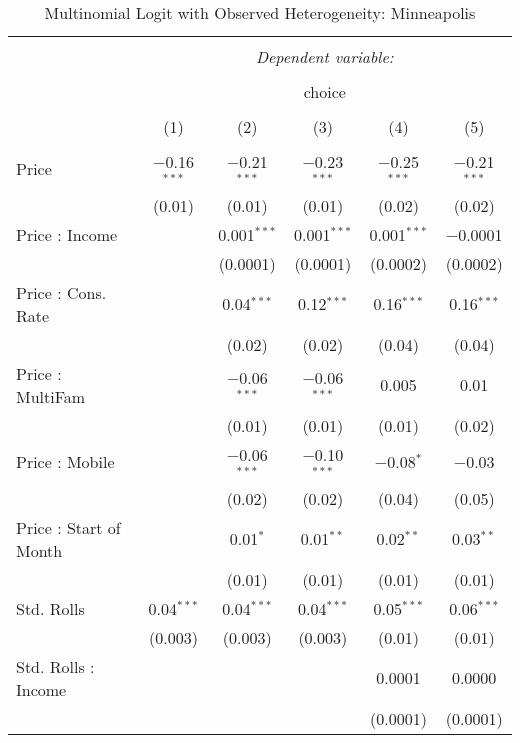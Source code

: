 
\begin{table}[!htbp] \centering 
  \caption{Multinomial Logit with Observed Heterogeneity: Minneapolis} 
  \label{tab:mnlMinneapolisObsHet} 
\begin{tabular}{@{\extracolsep{5pt}}lccccc} 
\\[-1.8ex]\hline 
\hline \\[-1.8ex] 
 & \multicolumn{5}{c}{\textit{Dependent variable:}} \\ 
\cline{2-6} 
\\[-1.8ex] & \multicolumn{5}{c}{choice} \\ 
\\[-1.8ex] & (1) & (2) & (3) & (4) & (5)\\ 
\hline \\[-1.8ex] 
 Price & $-$0.16$^{***}$ & $-$0.21$^{***}$ & $-$0.23$^{***}$ & $-$0.25$^{***}$ & $-$0.21$^{***}$ \\ 
  & (0.01) & (0.01) & (0.01) & (0.02) & (0.02) \\ 
  Price : Income &  & 0.001$^{***}$ & 0.001$^{***}$ & 0.001$^{***}$ & $-$0.0001 \\ 
  &  & (0.0001) & (0.0001) & (0.0002) & (0.0002) \\ 
  Price : Cons. Rate &  & 0.04$^{***}$ & 0.12$^{***}$ & 0.16$^{***}$ & 0.16$^{***}$ \\ 
  &  & (0.02) & (0.02) & (0.04) & (0.04) \\ 
  Price : MultiFam &  & $-$0.06$^{***}$ & $-$0.06$^{***}$ & 0.005 & 0.01 \\ 
  &  & (0.01) & (0.01) & (0.01) & (0.02) \\ 
  Price : Mobile &  & $-$0.06$^{***}$ & $-$0.10$^{***}$ & $-$0.08$^{*}$ & $-$0.03 \\ 
  &  & (0.02) & (0.02) & (0.04) & (0.05) \\ 
  Price : Start of Month &  & 0.01$^{*}$ & 0.01$^{**}$ & 0.02$^{**}$ & 0.03$^{**}$ \\ 
  &  & (0.01) & (0.01) & (0.01) & (0.01) \\ 
  Std. Rolls & 0.04$^{***}$ & 0.04$^{***}$ & 0.04$^{***}$ & 0.05$^{***}$ & 0.06$^{***}$ \\ 
  & (0.003) & (0.003) & (0.003) & (0.01) & (0.01) \\ 
  Std. Rolls : Income &  &  &  & 0.0001 & 0.0000 \\ 
  &  &  &  & (0.0001) & (0.0001) \\ 

\end{tabular}
\end{table}
